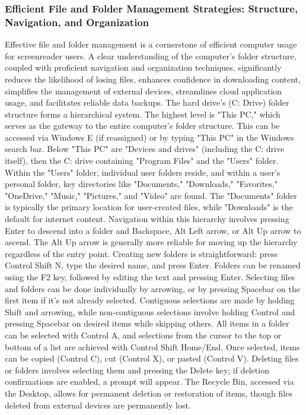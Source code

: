 \subsubsection{Efficient File and Folder Management Strategies: Structure, Navigation, and Organization}
Effective file and folder management is a cornerstone of efficient computer usage for screenreader users. A clear understanding of the computer's folder structure, coupled with proficient navigation and organization techniques, significantly reduces the likelihood of losing files, enhances confidence in downloading content, simplifies the management of external devices, streamlines cloud application usage, and facilitates reliable data backups.\supercite{kingsbury2025}
The hard drive's (C: Drive) folder structure forms a hierarchical system. The highest level is "This PC," which serves as the gateway to the entire computer's folder structure. This can be accessed via Windows E (if reassigned) or by typing "This PC" in the Windows search bar.\supercite{kingsbury2025} Below "This PC" are "Devices and drives" (including the C: drive itself), then the C: drive containing "Program Files" and the "Users" folder. Within the "Users" folder, individual user folders reside, and within a user's personal folder, key directories like "Documents," "Downloads," "Favorites," "OneDrive," "Music," "Pictures," and "Video" are found.\supercite{kingsbury2025} The "Documents" folder is typically the primary location for user-created files, while "Downloads" is the default for internet content.\supercite{kingsbury2025} Navigation within this hierarchy involves pressing Enter to descend into a folder and Backspace, Alt Left arrow, or Alt Up arrow to ascend. The Alt Up arrow is generally more reliable for moving up the hierarchy regardless of the entry point.\supercite{kingsbury2025}
Creating new folders is straightforward: press Control Shift N, type the desired name, and press Enter.\supercite{kingsbury2025} Folders can be renamed using the F2 key, followed by editing the text and pressing Enter.\supercite{kingsbury2025} Selecting files and folders can be done individually by arrowing, or by pressing Spacebar on the first item if it's not already selected. Contiguous selections are made by holding Shift and arrowing, while non-contiguous selections involve holding Control and pressing Spacebar on desired items while skipping others.\supercite{kingsbury2025} All items in a folder can be selected with Control A, and selections from the cursor to the top or bottom of a list are achieved with Control Shift Home/End.\supercite{kingsbury2025} Once selected, items can be copied (Control C), cut (Control X), or pasted (Control V).\supercite{kingsbury2025} Deleting files or folders involves selecting them and pressing the Delete key; if deletion confirmations are enabled, a prompt will appear.\supercite{kingsbury2025} The Recycle Bin, accessed via the Desktop, allows for permanent deletion or restoration of items, though files deleted from external devices are permanently lost.\supercite{kingsbury2025}
